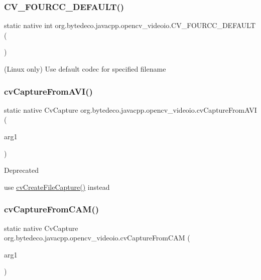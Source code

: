 \subsubsection{\texorpdfstring{C\+V\+\_\+\+F\+O\+U\+R\+C\+C\+\_\+\+D\+E\+F\+A\+U\+L\+T()}{CV\_FOURCC\_DEFAULT()}}
{\footnotesize\ttfamily static native int org.\+bytedeco.\+javacpp.\+opencv\+\_\+videoio.\+C\+V\+\_\+\+F\+O\+U\+R\+C\+C\+\_\+\+D\+E\+F\+A\+U\+LT (\begin{DoxyParamCaption}{ }\end{DoxyParamCaption})\hspace{0.3cm}{\ttfamily [static]}}

(Linux only) Use default codec for specified filename \mbox{\label{group__videoio__c_ga153463bfe93115b2ff7783a8c504d2a7}} 
\subsubsection{\texorpdfstring{cv\+Capture\+From\+A\+V\+I()}{cvCaptureFromAVI()}}
{\footnotesize\ttfamily static native Cv\+Capture org.\+bytedeco.\+javacpp.\+opencv\+\_\+videoio.\+cv\+Capture\+From\+A\+VI (\begin{DoxyParamCaption}\item[{@Cast(\char`\"{}const char$\ast$\char`\"{}) Byte\+Pointer}]{arg1 }\end{DoxyParamCaption})\hspace{0.3cm}{\ttfamily [static]}}

\begin{DoxyRefDesc}{Deprecated}
\item[\hyperlink{deprecated__deprecated000003}{Deprecated}]use \hyperlink{group__videoio__c_gaf71dcb88fc0c7476076b298ed762ddca}{cv\+Create\+File\+Capture()} instead \end{DoxyRefDesc}
\mbox{\label{group__videoio__c_gafab92effdc81a1a2eb305dc69eb84bfd}} 
\subsubsection{\texorpdfstring{cv\+Capture\+From\+C\+A\+M()}{cvCaptureFromCAM()}}
{\footnotesize\ttfamily static native Cv\+Capture org.\+bytedeco.\+javacpp.\+opencv\+\_\+videoio.\+cv\+Capture\+From\+C\+AM (\begin{DoxyParamCaption}\item[{int}]{arg1 }\end{DoxyParamCaption})\hspace{0.3cm}{\ttfamily [static]}}

